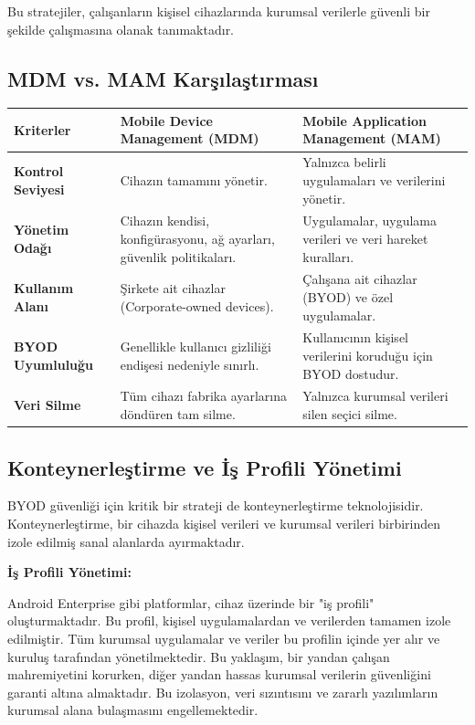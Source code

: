 Bu stratejiler, çalışanların kişisel cihazlarında kurumsal verilerle güvenli bir şekilde çalışmasına olanak tanımaktadır.

\subsection{MDM vs. MAM Karşılaştırması}

\begin{longtable}{|p{4.5cm}|p{4.5cm}|p{4.5cm}|}
\hline
\textbf{Kriterler} & \textbf{Mobile Device Management (MDM)} & \textbf{Mobile Application Management (MAM)} \\
\hline
\textbf{Kontrol Seviyesi} & Cihazın tamamını yönetir. & Yalnızca belirli uygulamaları ve verilerini yönetir. \\
\hline
\textbf{Yönetim Odağı} & Cihazın kendisi, konfigürasyonu, ağ ayarları, güvenlik politikaları. & Uygulamalar, uygulama verileri ve veri hareket kuralları. \\
\hline
\textbf{Kullanım Alanı} & Şirkete ait cihazlar (Corporate-owned devices). & Çalışana ait cihazlar (BYOD) ve özel uygulamalar. \\
\hline
\textbf{BYOD Uyumluluğu} & Genellikle kullanıcı gizliliği endişesi nedeniyle sınırlı. & Kullanıcının kişisel verilerini koruduğu için BYOD dostudur. \\
\hline
\textbf{Veri Silme} & Tüm cihazı fabrika ayarlarına döndüren tam silme. & Yalnızca kurumsal verileri silen seçici silme. \\
\hline
\end{longtable}

\subsection{Konteynerleştirme ve İş Profili Yönetimi}

BYOD güvenliği için kritik bir strateji de konteynerleştirme teknolojisidir. Konteynerleştirme, bir cihazda kişisel verileri ve kurumsal verileri birbirinden izole edilmiş sanal alanlarda ayırmaktadır.

\textbf{İş Profili Yönetimi:}

Android Enterprise gibi platformlar, cihaz üzerinde bir "iş profili" oluşturmaktadır. Bu profil, kişisel uygulamalardan ve verilerden tamamen izole edilmiştir. Tüm kurumsal uygulamalar ve veriler bu profilin içinde yer alır ve kuruluş tarafından yönetilmektedir. Bu yaklaşım, bir yandan çalışan mahremiyetini korurken, diğer yandan hassas kurumsal verilerin güvenliğini garanti altına almaktadır. Bu izolasyon, veri sızıntısını ve zararlı yazılımların kurumsal alana bulaşmasını engellemektedir.


